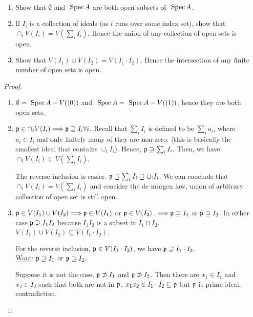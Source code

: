 \begin{exr}\ 
\begin{enumerate}[label=(\alph*)]
\item Show that $\emptyset$ and $\text{ Spec\,} A$ are both open subsets of $\text{ Spec\,} A$.
\item If $I_i$ is a collection of ideals (as $i$ runs over some index set), show that $\cap_i V(I_i) =
V(\sum_i I_i)$. Hence the union of any collection of open sets is open.
\item  Show that $V(I_1) \cup V(I_2) = V(I_1\cdot I_2)$. Hence the intersection of any finite number of open sets is open.
\end{enumerate}
\end{exr}
\begin{proof}
\begin{enumerate}[label=(\alph*)]
\item $\emptyset=\text{ Spec\,} A-V((0))$ and $\text{ Spec\,} A=\text{ Spec\,} A-V((1))$, hence they are both open sets.
\item ${\mathfrak p}\in\cap_iV(I_i)\Longrightarrow {\mathfrak p}\supseteq I_i\forall i$. Recall that $\sum_i I_i$ is defined to be $\sum_i a_i$, where $a_i\in I_i$ and only finitely many of they are non-zero. (this is basically the smallest ideal that contains $\cup_i I_i$). Hence, ${\mathfrak p}\supseteq \sum_i I_i$. Then, we have $\cap_i V(I_i)\subseteq V(\sum_i I_i)$.

The reverse inclusion is easier. ${\mathfrak p}\supseteq \sum_i I_i\supseteq \cup_iI_i$. We can conclude that $\cap_i V(I_i)=V(\sum_i I_i)$ and consider the de morgen law, union of arbitrary collection of open set is still open.
\item ${\mathfrak p}\in V(I_1)\cup V(I_2)\Longrightarrow {\mathfrak p}\in V(I_1)$ or ${\mathfrak p}\in V(I_2)$. $\Longrightarrow {\mathfrak p}\supseteq I_1$ or ${\mathfrak p}\supseteq I_2$. In either case ${\mathfrak p}\supseteq I_1I_2$ because $I_1I_2$ is a subset in $I_1\cap I_2$. $V(I_1)\cup V(I_2)\subseteq V(I_1\cdot I_2)$.

For the reverse inclusion, ${\mathfrak p}\in V(I_1\cdot I_2)$, we have ${\mathfrak p}\supseteq I_1\cdot I_2$.\\
\underline{Want}: ${\mathfrak p}\supseteq I_1$ or ${\mathfrak p}\supseteq I_2$.

Suppose it is not the case, ${\mathfrak p}\not \supset I_1$ and ${\mathfrak p}\not \supset I_2$. Then there are $x_1\in I_1$ and $x_2\in I_2$ such that both are not in ${\mathfrak p}$. $x_1x_2\in I_1\cdot I_2 \subseteq {\mathfrak p}$ but ${\mathfrak p}$ is prime ideal, contradiction.
\end{enumerate}
\end{proof}

